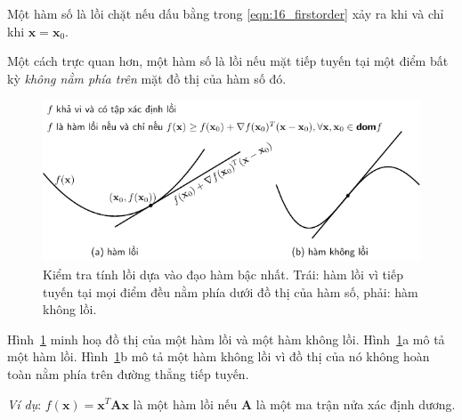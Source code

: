 Một hàm số là lồi chặt nếu dấu bằng trong \eqref{eqn:16_firstorder} xảy ra khi và chỉ khi $\mathbf{x} = \mathbf{x}_0$. 
 
Một cách trực quan hơn, một hàm số là lồi nếu mặt tiếp tuyến tại một điểm
bất kỳ \textit{không nằm phía trên} mặt đồ thị của hàm số đó.




\begin{figure}[t]
\centering
    \includegraphics[width = \textwidth]{Chapters/08_ConvexOptimization/16_convexity/latex/first_order.pdf}
    \caption[]{Kiểm tra tính lồi dựa vào đạo hàm bậc nhất. Trái: hàm lồi vì tiếp tuyến tại mọi điểm đều nằm phía dưới đồ thị của hàm số, phải: hàm không lồi.}
    \label{fig:16_firstorder}
\end{figure}

Hình~\ref{fig:16_firstorder} minh hoạ đồ thị của một hàm lồi và một hàm không
lồi. Hình~\ref{fig:16_firstorder}a mô tả một hàm lồi.
Hình~\ref{fig:16_firstorder}b mô tả một hàm không lồi vì đồ thị của nó không hoàn toàn nằm phía trên đường thẳng tiếp tuyến.
 
\textit{Ví dụ}: $f(\mathbf{x}) = \mathbf{x}^T\mathbf{A}\mathbf{x}$ là một hàm lồi nếu  $\mathbf{A}$ là một ma trận {nửa xác định dương}. 
 
